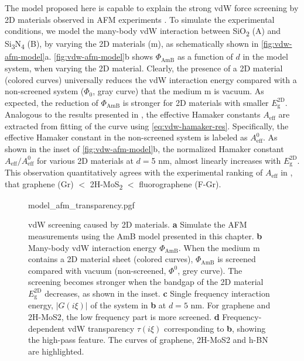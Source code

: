 The model proposed here is capable to explain the
strong vdW force screening by 2D materials observed in AFM experiments
\cite{Tsoi_2014_vdW_screening_2D}.
%
To simulate the experimental conditions, we model the
many-body vdW interaction between SiO\textsubscript{2} (A) and Si\textsubscript{3}N\textsubscript{4} (B), by
varying the 2D materials (m), as schematically shown in \autoref{fig:vdw-afm-model}a.
\autoref{fig:vdw-afm-model}b shows \(\Phi_{\mathrm{AmB}}\) as a function of
\(d\) in the model system, when varying the 2D material.
%
Clearly, the presence of a 2D material (colored curves) universally
reduces the vdW interaction energy compared with a non-screened system
(\(\Phi_{0}\), gray curve) that the medium m is vacuum.
%
As expected, the reduction of $\Phi_{\mathrm{AmB}}$ is stronger for 2D
materials with smaller \(E_{\mathrm{g}}^{\mathrm{2D}}\).
%
Analogous to the results presented in
\cite{Tsoi_2014_vdW_screening_2D}, the effective Hamaker constants
\(A_{\mathrm{eff}}\) are extracted from fitting of the curve using
\autoref{eq:vdw-hamaker-res}. 
%
Specifically, the effective Hamaker constant in the non-screened system is labeled as $A_{\mathrm{eff}}^{0}$.
%
As shown in the inset of \autoref{fig:vdw-afm-model}b, the normalized
Hamaker constant $A_{\mathrm{eff}} / A_{\mathrm{eff}}^{0}$ for various
2D materials at $d=$5 nm, almost linearly increases with
\(E_{\mathrm{g}}^{\mathrm{2D}}\).
%
This
observation quantitatively agrees with the experimental ranking of
\(A_{\mathrm{eff}}\) in \cite{Tsoi_2014_vdW_screening_2D}, that graphene (Gr) $<$ 2H-MoS\textsubscript{2} $<$ fluoro\-graphene (F-Gr).
\begin{figure}[!htbp]
  \centering{}
  {model_afm_transparency.pgf}
  \caption{\label{fig:vdw-afm-model}%
    vdW screening caused by 2D materials. {\bfseries a} Simulate the
    AFM measurements using the AmB model presented in this
    chapter. {\bfseries b} Many-body vdW interaction energy
    $\Phi_{\mathrm{AmB}}$. When the medium m contains a 2D material
    sheet (colored curves), $\Phi_{\mathrm{AmB}}$ is screened compared
    with vacuum (non-screened, $\Phi^{0}$, grey curve). The screening
    becomes stronger when the bandgap of the 2D material
    $E_{\mathrm{g}}^{\mathrm{2D}}$ decreases, as shown in the
    inset. {\bfseries c} Single frequency interaction energy,
    $|G(i\xi)|$ of the system in {\bfseries b} at $d = 5$ nm. For
    graphene and 2H-MoS2, the low frequency part is more
    screened. {\bfseries d} Frequency- dependent vdW transparency
    $\tau(i \xi)$ corresponding to {\bfseries b}, showing the
    high-pass feature. The curves of graphene, 2H-MoS2 and h-BN are
    highlighted.  }
\end{figure}
%

